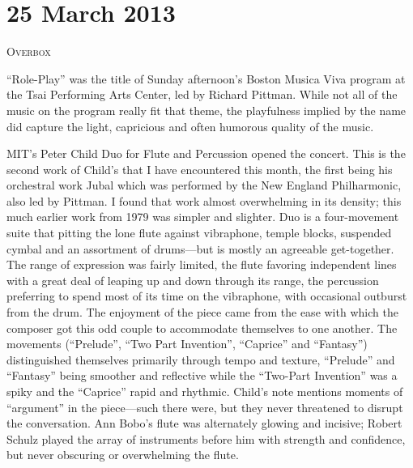 \chapter{25 March 2013}

\textsc{Overbox}

“Role-Play” was the title of Sunday afternoon’s Boston Musica Viva program at the Tsai Performing Arts Center, led by Richard Pittman. While not all of the music on the program really fit that theme, the playfulness implied by the name did capture the light, capricious and often humorous quality of the music.

MIT’s Peter Child Duo for Flute and Percussion opened the concert. This is the second work of Child’s that I have encountered this month, the first being his orchestral work Jubal which was performed by the New England Philharmonic, also led by Pittman. I found that work almost overwhelming in its density; this much earlier work from 1979 was simpler and slighter. Duo is a four-movement suite that pitting the lone flute against vibraphone, temple blocks, suspended cymbal and an assortment of drums—but is mostly an agreeable get-together. The range of expression was fairly limited, the flute favoring independent lines with a great deal of leaping up and down through its range, the percussion preferring to spend most of its time on the vibraphone, with occasional outburst from the drum. The enjoyment of the piece came from the ease with which the composer got this odd couple to accommodate themselves to one another. The movements (“Prelude”, “Two Part Invention”, “Caprice” and “Fantasy”) distinguished themselves primarily through tempo and texture, “Prelude” and “Fantasy” being smoother and reflective while the “Two-Part Invention” was a spiky and the “Caprice” rapid and rhythmic. Child’s note mentions moments of “argument” in the piece—such there were, but they never threatened to disrupt the conversation. Ann Bobo’s flute was alternately glowing and incisive; Robert Schulz played the array of instruments before him with strength and confidence, but never obscuring or overwhelming the flute.

